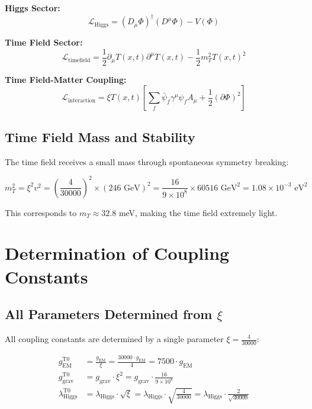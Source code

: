 \documentclass[12pt,a4paper]{report}
\newcommand{\Tfield}{T(x,t)}  %
\newcommand{\xipar}{\xi}      %
\begin{document}
	\textbf{Higgs Sector:}
	\begin{equation}
		\mathcal{L}_{\text{Higgs}} = (D_\mu \Phi)^\dagger (D^\mu \Phi) - V(\Phi)
	\end{equation}
	
	\textbf{Time Field Sector:}
	\begin{equation}
		\mathcal{L}_{\text{timefield}} = \frac{1}{2} \partial_\mu \Tfield \partial^\mu \Tfield - \frac{1}{2} m_T^2 \Tfield^2
	\end{equation}
	
	\textbf{Time Field-Matter Coupling:}
	\begin{equation}
		\mathcal{L}_{\text{interaction}} = \xipar \Tfield \left[ \sum_f \bar{\psi}_f \gamma^\mu \psi_f A_\mu + \frac{1}{2} (\partial \Phi)^2 \right]
	\end{equation}
	
	\subsection{Time Field Mass and Stability}\label{subsec:timefield_mass}
	
	The time field receives a small mass through spontaneous symmetry breaking:
	
	\begin{equation}\label{eq:timefield_mass}
		m_T^2 = \xipar^2 v^2 = \left(\frac{4}{30000}\right)^2 \times (246 \text{ GeV})^2 = \frac{16}{9 \times 10^8} \times 60516 \text{ GeV}^2 = 1.08 \times 10^{-3} \text{ eV}^2
	\end{equation}
	
	This corresponds to $m_T \approx 32.8$ meV, making the time field extremely light.
	
	\section{Determination of Coupling Constants}\label{sec:coupling_constants}

\subsection{All Parameters Determined from $\xipar$}\label{subsec:parameters_from_xi}

All coupling constants are determined by a single parameter $\xipar = \frac{4}{30000}$:

\begin{align}
	g_{\text{EM}}^{\text{T0}} &= \frac{g_{\text{EM}}}{\xipar} = \frac{30000 \cdot g_{\text{EM}}}{4} = 7500 \cdot g_{\text{EM}} \\
	g_{\text{grav}}^{\text{T0}} &= g_{\text{grav}} \cdot \xipar^2 = g_{\text{grav}} \cdot \frac{16}{9 \times 10^8} \\
	\lambda_{\text{Higgs}}^{\text{T0}} &= \lambda_{\text{Higgs}} \cdot \sqrt{\xipar} = \lambda_{\text{Higgs}} \cdot \sqrt{\frac{4}{30000}} = \lambda_{\text{Higgs}} \cdot \frac{2}{\sqrt{30000}}
\end{align}
\end{document}
